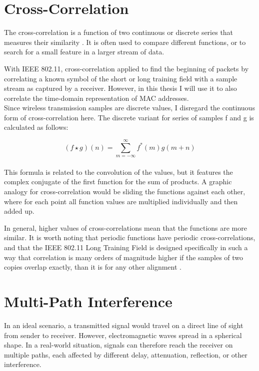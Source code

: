 
\section{Cross-Correlation}

The cross-correlation is a function of two continuous or discrete series that measures their similarity \cite{NEEDED}. It is often used to compare different functions, or to search for a small feature in a larger stream of data.

With IEEE 802.11, cross-correlation applied to find the beginning of packets by correlating a known symbol of the short or long training field with a sample stream as captured by a receiver. However, in this thesis I will use it to also correlate the time-domain representation of MAC addresses.\\

Since wireless transmission samples are discrete values, I disregard the continuous form of cross-correlation here. The discrete variant for series of samples f and g is calculated as follows:

$$ (f \star g)(n) = \sum_{m=-\infty}^{\infty} f^{\ast}(m) g(m+n) $$\\

This formula is related to the convolution of the values, but it features the complex conjugate of the first function for the sum of products. A graphic analogy for cross-correlation would be sliding the functions against each other, where for each point all function values are multiplied individually and then added up.

In general, higher values of cross-correlations mean that the functions are more similar. It is worth noting that periodic functions have periodic cross-correlations, and that the IEEE 802.11 Long Training Field is designed specifically in such a way that correlation is many orders of magnitude higher if the samples of two copies overlap exactly, than it is for any other alignment \cite{perahia2013}.



\section{Multi-Path Interference}

In an ideal scenario, a transmitted signal would travel on a direct line of sight from sender to receiver. However, electromagnetic waves spread in a spherical shape. In a real-world situation, signals can therefore reach the receiver on multiple paths, each affected by different delay, attenuation, reflection, or other interference.

